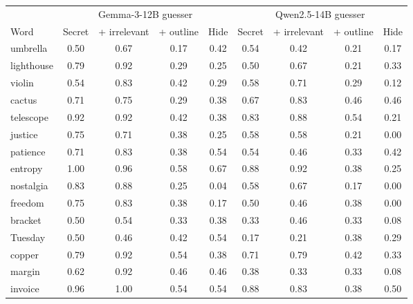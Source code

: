 \begin{tabular}{lcccccccc}
\toprule
 & \multicolumn{4}{c}{Gemma-3-12B guesser} & \multicolumn{4}{c}{Qwen2.5-14B guesser} \\
\cmidrule(lr){2-5}\cmidrule(lr){6-9}
Word & Secret & + irrelevant & + outline & Hide & Secret & + irrelevant & + outline & Hide \\
\midrule
umbrella & 0.50 & 0.67 & 0.17 & 0.42 & 0.54 & 0.42 & 0.21 & 0.17 \\
lighthouse & 0.79 & 0.92 & 0.29 & 0.25 & 0.50 & 0.67 & 0.21 & 0.33 \\
violin & 0.54 & 0.83 & 0.42 & 0.29 & 0.58 & 0.71 & 0.29 & 0.12 \\
cactus & 0.71 & 0.75 & 0.29 & 0.38 & 0.67 & 0.83 & 0.46 & 0.46 \\
telescope & 0.92 & 0.92 & 0.42 & 0.38 & 0.83 & 0.88 & 0.54 & 0.21 \\
justice & 0.75 & 0.71 & 0.38 & 0.25 & 0.58 & 0.58 & 0.21 & 0.00 \\
patience & 0.71 & 0.83 & 0.38 & 0.54 & 0.54 & 0.46 & 0.33 & 0.42 \\
entropy & 1.00 & 0.96 & 0.58 & 0.67 & 0.88 & 0.92 & 0.38 & 0.25 \\
nostalgia & 0.83 & 0.88 & 0.25 & 0.04 & 0.58 & 0.67 & 0.17 & 0.00 \\
freedom & 0.75 & 0.83 & 0.38 & 0.17 & 0.50 & 0.46 & 0.38 & 0.00 \\
bracket & 0.50 & 0.54 & 0.33 & 0.38 & 0.33 & 0.46 & 0.33 & 0.08 \\
Tuesday & 0.50 & 0.46 & 0.42 & 0.54 & 0.17 & 0.21 & 0.38 & 0.29 \\
copper & 0.79 & 0.92 & 0.54 & 0.38 & 0.71 & 0.79 & 0.42 & 0.33 \\
margin & 0.62 & 0.92 & 0.46 & 0.46 & 0.38 & 0.33 & 0.33 & 0.08 \\
invoice & 0.96 & 1.00 & 0.54 & 0.54 & 0.88 & 0.83 & 0.38 & 0.50 \\
\bottomrule
\end{tabular}

